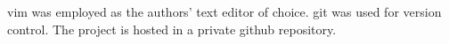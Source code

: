 vim was employed as the authors' text editor of choice.
git was used for version control.
The project is hosted in a private github repository.
